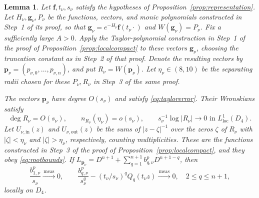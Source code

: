 \documentclass[11pt,letterpaper,reqno]{amsart}
\newtheorem{lem}[thm]{Lemma}
\theoremstyle{remark}
\numberwithin{equation}{section}
\newcommand{\loc}{\mathrm{loc}}
\newcommand{\convmeas}{\xrightarrow{\,\mathrm{meas}\,}}
\newcommand{\fv}{\bm f}
\newcommand{\gv}{\bm g}
\newcommand{\pv}{\bm p}
\begin{document}
\begin{lem}\label{lem:replacement}
Let $\fv,t_\nu,s_\nu$ satisfy the hypotheses of
Proposition~\ref{prop:representation}. Let $H_\nu,\gv_\nu,P_\nu$ be the
functions, vectors, and monic polynomials constructed in Step~1 of its
proof, so that $\gv_\nu=e^{-H_\nu}\fv(t_\nu\cdot)$ and
$W(\gv_\nu)=P_\nu$. Fix a sufficiently large $A>0$.
Apply the Taylor-polynomial construction in Step~1 of the proof of
Proposition~\ref{prop:localcompact} to these vectors $\gv_\nu$, choosing
the truncation constant as in Step~2 of that proof. Denote the resulting
vectors by $\pv_\nu=(p_{\nu,0},\ldots,p_{\nu,n})$, and put
$R_\nu=W(\pv_\nu)$. Let $\eta_\nu\in(8,10)$ be the separating radii
chosen for these $P_\nu,R_\nu$ in Step~3 of the same proof.

The vectors $\pv_\nu$ have degree $O(s_\nu)$ and satisfy
\eqref{eq:taylorerror}. Their Wronskians satisfy
\begin{equation}\label{eq:replacement-data}
 \deg R_\nu=O(s_\nu),\qquad n_{R_\nu}(\eta_\nu)=o(s_\nu),\qquad
 s_\nu^{-1}\log|R_\nu|\longrightarrow0\text{ in }L^1_{\loc}(D_4).
\end{equation}
Let $U_{\nu,\mathrm{in}}(z)$ and $U_{\nu,\mathrm{out}}(z)$ be the sums
of $|z-\zeta|^{-1}$ over the zeros $\zeta$ of $R_\nu$ with
$|\zeta|<\eta_\nu$ and $|\zeta|>\eta_\nu$, respectively, counting
multiplicities. These are the functions constructed in Step~3 of the
proof of Proposition~\ref{prop:localcompact}, and they obey
\eqref{eq:rootbounds}. If
$L_{\pv_\nu}=D^{n+1}+\sum_{q=1}^{n+1}b^p_{q,\nu}D^{n+1-q}$, then
\begin{equation}\label{eq:polynomial-coefficients}
 \frac{b^p_{1,\nu}}{s_\nu}\convmeas0,\qquad
 \frac{b^p_{q,\nu}}{s_\nu^q}-(t_\nu/s_\nu)^qQ_q(t_\nu z)\convmeas0,
 \quad 2\le q\le n+1,
\end{equation}
locally on $D_4$.
\end{lem}
\end{document}
